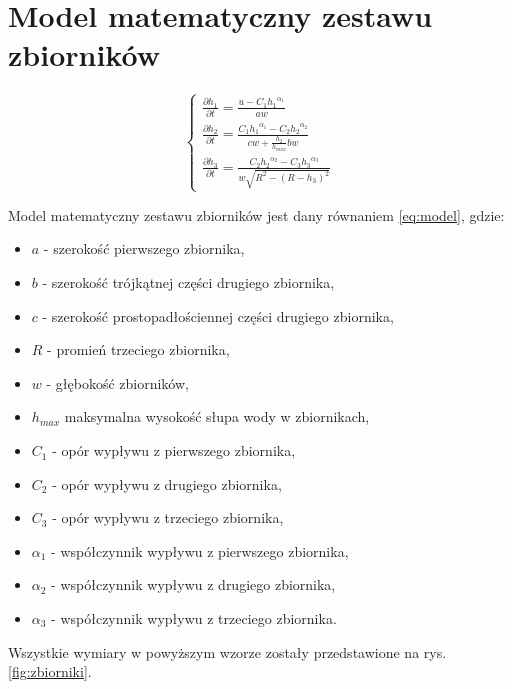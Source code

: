 \section{Model matematyczny zestawu zbiorników}
\label{sec:model}


\begin{equation}\label{eq:model}
	\left \{
	\begin{array}{lr}
		\frac{\partial h_{1}}{\partial t} = \frac{u - C_{1}{h_{1}}^{\alpha_{1}}}{aw} \\[8pt]
		\frac{\partial h_{2}}{\partial t} = \frac{C_{1}{h_{1}}^{\alpha_{1}} -  C_{2}{h_{2}}^{\alpha_{2}}}{cw + \frac{h_{2}}{h_{max}}bw} \\[20pt]
		\frac{\partial h_{3}}{\partial t} = \frac{C_{2}{h_{2}}^{\alpha_{2}} -  C_{3}{h_{3}}^{\alpha_{3}}}{w\sqrt{R^{2} - (R - h_{3})^{2}}}
	\end{array}
	\right.
\end{equation}

Model matematyczny zestawu zbiorników jest dany równaniem \ref{eq:model}, gdzie:
\begin{itemize}
	\item $a$ - szerokość pierwszego zbiornika,
	\item $b$ - szerokość trójkątnej części drugiego zbiornika,
	\item $c$ - szerokość prostopadłościennej części drugiego zbiornika,
	\item $R$ - promień trzeciego zbiornika,
	\item $w$ - głębokość zbiorników,
	\item $h_{max}$ maksymalna wysokość słupa wody w zbiornikach,
	\item $C_{1}$ - opór wypływu z pierwszego zbiornika,
	\item $C_{2}$ - opór wypływu z drugiego zbiornika,
	\item $C_{3}$ - opór wypływu z trzeciego zbiornika,
    \item $\alpha_{1}$ - współczynnik wypływu z pierwszego zbiornika,
    \item $\alpha_{2}$ - współczynnik wypływu z drugiego zbiornika,
    \item $\alpha_{3}$ - współczynnik wypływu z trzeciego zbiornika.
\end{itemize}
Wszystkie wymiary w powyższym wzorze zostały przedstawione na rys. \ref{fig:zbiorniki}.

